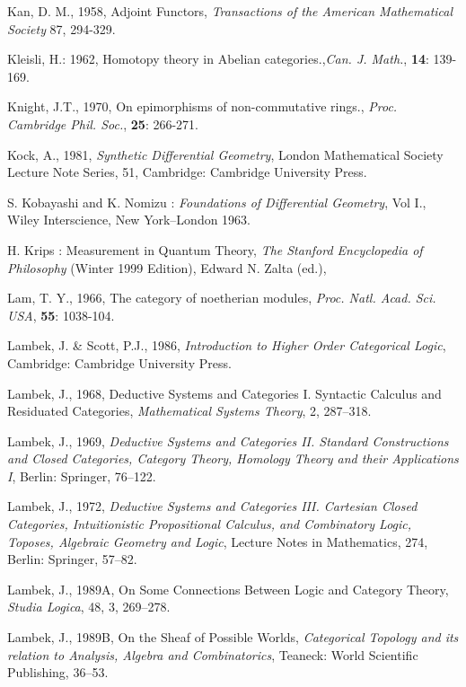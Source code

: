 \documentclass[12pt]{article}
\theoremstyle{plain}
\theoremstyle{definition}
\numberwithin{equation}{section}
\begin{document}
\begin{thebibliography}{199}
Kan, D. M., 1958, Adjoint Functors, {\em Transactions of the American Mathematical Society} 87, 294-329.  

Kleisli, H.: 1962, Homotopy theory in Abelian categories.,{\em Can. J. Math.}, \textbf{14}: 139-169.

Knight, J.T., 1970, On epimorphisms of non-commutative rings., {\em Proc. Cambridge Phil. Soc.},
\textbf{25}: 266-271.

Kock, A., 1981, {\em Synthetic Differential Geometry}, London Mathematical Society Lecture Note Series, 51, Cambridge: Cambridge University Press. 

S. Kobayashi and K. Nomizu : {\em Foundations of Differential Geometry}, Vol I., Wiley Interscience, New York--London 1963.

H. Krips : Measurement in Quantum Theory, \emph{The Stanford Encyclopedia of Philosophy } (Winter 1999 Edition), 
Edward N. Zalta (ed.), 

Lam, T. Y., 1966, The category of noetherian modules, {\em Proc. Natl. Acad. Sci. USA}, \textbf{55}: 1038-104.

Lambek, J. \& Scott, P.J., 1986, {\em Introduction to Higher Order Categorical Logic}, Cambridge: Cambridge University Press. 

Lambek, J., 1968, Deductive Systems and Categories I. Syntactic Calculus and Residuated Categories, 
{\em Mathematical Systems Theory}, 2, 287--318. 

Lambek, J., 1969, {\em Deductive Systems and Categories II. Standard Constructions and Closed Categories, Category Theory, Homology Theory and their Applications I}, Berlin: Springer, 76--122. 

Lambek, J., 1972, {\em Deductive Systems and Categories III. Cartesian Closed Categories, Intuitionistic Propositional Calculus, and Combinatory Logic, Toposes, Algebraic Geometry and Logic}, Lecture Notes in Mathematics, 274, Berlin: Springer, 57--82.  

Lambek, J., 1989A, On Some Connections Between Logic and Category Theory, {\em Studia Logica}, 48, 3, 269--278. 

Lambek, J., 1989B, On the Sheaf of Possible Worlds, {\em Categorical Topology and its relation to Analysis, Algebra and Combinatorics}, Teaneck: World Scientific Publishing, 36--53. 


\end{thebibliography}
\end{document}
